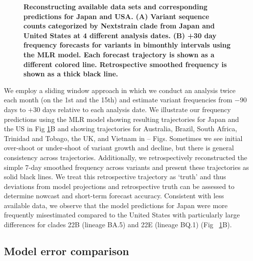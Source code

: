 \documentclass[10pt,letterpaper]{article}
\begin{document}
\begin{figure}[tb!]
	\centering
	\caption{
		\bf{Reconstructing available data sets and corresponding predictions for Japan and USA.}
		(A) Variant sequence counts categorized by Nextstrain clade from Japan and United States at 4 different analysis dates.
		(B) +30 day frequency forecasts for variants in bimonthly intervals using the MLR model.
		Each forecast trajectory is shown as a different colored line.
		Retrospective smoothed frequency is shown as a thick black line.
	}
	\label{fig:Fig1}
\end{figure}

We employ a sliding window approach in which we conduct an analysis twice each month (on the 1st and the 15th) and estimate variant frequencies from $-90$ days to $+30$ days relative to each analysis date.
We illustrate our frequency predictions using the MLR model showing resulting trajectories for Japan and the US in Fig \ref{fig:Fig1}B and showing trajectories for Australia, Brazil, South Africa, Trinidad and Tobago, the UK, and Vietnam in -- Figs.
Sometimes we see initial over-shoot or under-shoot of variant growth and decline, but there is general consistency across trajectories.
Additionally, we retrospectively reconstructed the simple 7-day smoothed frequency across variants and present these trajectories as solid black lines.
We treat this retrospective trajectory as `truth' and thus deviations from model projections and retrospective truth can be assessed to determine nowcast and short-term forecast accuracy.
Consistent with less available data, we observe that the model predictions for Japan were more frequently misestimated compared to the United States with particularly large differences for clades 22B (lineage BA.5) and 22E (lineage BQ.1) (Fig ~\ref{fig:Fig1}B).



\subsection*{Model error comparison}
\end{document}

